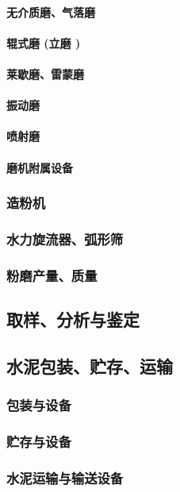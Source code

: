 \documentclass[UTF8]{../../ApplicationUniverse}
\begin{document}
            \paragraph{无介质磨、气落磨}
            \paragraph{辊式磨 (立磨 )}
            \paragraph{莱歇磨、雷蒙磨}
            \paragraph{振动磨}
            \paragraph{喷射磨}
            \paragraph{磨机附属设备}
        \subsubsection{造粉机}
        \subsubsection{水力旋流器、弧形筛}
        \subsubsection{粉磨产量、质量}
    \subsection{取样、分析与鉴定}
    \subsection{水泥包装、贮存、运输}
        \subsubsection{包装与设备}
        \subsubsection{贮存与设备}
        \subsubsection{水泥运输与输送设备}
\end{document}

